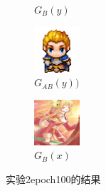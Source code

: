 \documentclass[twocolumn,11pt]{ctexart}
\begin{document}
\begin{figure}[htb]
\begin{subfigure}[b]{0.23\linewidth}
        \caption{$G_B(y)$}
      \end{subfigure}
      \begin{subfigure}[b]{0.23\linewidth}
        \includegraphics[width=\linewidth]{exp2_epoch100_rec_B.png}
        \caption{$G_{AB}(y))$}
      \end{subfigure}
      \begin{subfigure}[b]{0.23\linewidth}
        \includegraphics[width=\linewidth]{exp2_epoch100_idt_B.png}
        \caption{$G_B(x)$}
      \end{subfigure}
      \caption{实验2epoch100的结果}
      \label{fig:exp2epoch100}
\end{figure}
\end{document}
